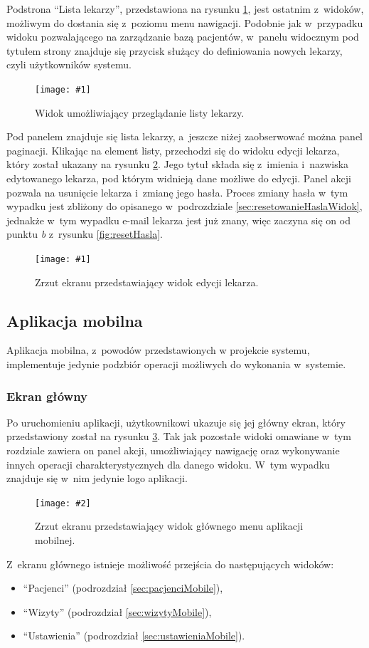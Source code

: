 \documentclass[11pt]{aghdpl}
\newcommand{\fullWidthPicture}[2]{
\begin{figure}[h!]
	\centering
		\texttt{[image: \#1]}
	\caption{#2}
	\label{fig:#1}
\end{figure}
}
\newcommand{\customWidthPicture}[3]{
\begin{figure}[h!]
	\centering
		\texttt{[image: \#2]}
	\caption{#3}
	\label{fig:#2}
\end{figure}
}
\begin{document}
Podstrona ``Lista lekarzy'', przedstawiona na rysunku \ref{fig:lekarze}, jest ostatnim z~widoków, możliwym do dostania się z~poziomu menu nawigacji. Podobnie jak w~przypadku widoku pozwalającego na zarządzanie bazą pacjentów, w~panelu widocznym pod tytułem strony znajduje się przycisk służący do definiowania nowych lekarzy, czyli użytkowników systemu.

\fullWidthPicture{lekarze}{Widok umożliwiający przeglądanie listy lekarzy.}

Pod panelem znajduje się lista lekarzy, a~jeszcze niżej zaobserwować można panel paginacji. Klikając na element listy, przechodzi się do widoku edycji lekarza, który został ukazany na rysunku \ref{fig:lekarz}. Jego tytuł składa się z~imienia i~nazwiska edytowanego lekarza, pod którym widnieją dane możliwe do edycji. Panel akcji pozwala na usunięcie lekarza i~zmianę jego hasła. Proces zmiany hasła w~tym wypadku jest zbliżony do opisanego w~podrozdziale \ref{sec:resetowanieHaslaWidok}, jednakże w~tym wypadku e-mail lekarza jest już znany, więc zaczyna się on od punktu \emph{b} z~rysunku \ref{fig:resetHasla}.

\fullWidthPicture{lekarz}{Zrzut ekranu przedstawiający widok edycji lekarza.}

\subsection{Aplikacja mobilna}

Aplikacja mobilna, z~powodów przedstawionych w projekcie systemu, implementuje jedynie podzbiór operacji możliwych do wykonania w~systemie.

\subsubsection{Ekran główny}
\label{sec:ekranGlownyMobile}

Po uruchomieniu aplikacji, użytkownikowi ukazuje się jej główny ekran, który przedstawiony został na rysunku \ref{fig:ekranGlownyMobile}. Tak jak pozostałe widoki omawiane w~tym rozdziale zawiera on panel akcji, umożliwiający nawigację oraz wykonywanie innych operacji charakterystycznych dla danego widoku. W~tym wypadku znajduje się w~nim jedynie logo aplikacji.

\customWidthPicture{.3}{ekranGlownyMobile}{Zrzut ekranu przedstawiający widok głównego menu aplikacji mobilnej.}

Z~ekranu głównego istnieje możliwość przejścia do następujących widoków:
\begin{itemize}
\item ``Pacjenci'' (podrozdział \ref{sec:pacjenciMobile}),
\item ``Wizyty'' (podrozdział \ref{sec:wizytyMobile}),
\item ``Ustawienia'' (podrozdział \ref{sec:ustawieniaMobile}).
\end{itemize}
\end{document}
